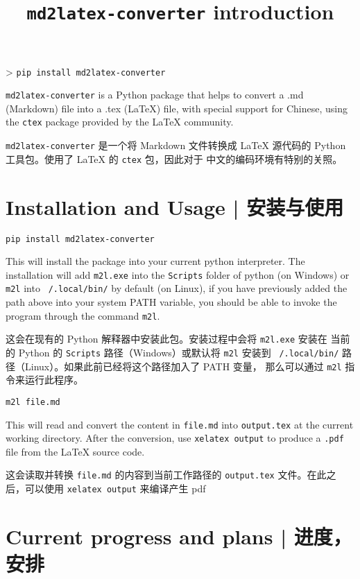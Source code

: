 \documentclass{ctexart}
\title{\texttt{md2latex-converter} introduction }
\begin{document}
	\maketitle

	> \texttt{pip install md2latex-converter}

	\texttt{md2latex-converter} is a Python package that helps to convert a .md (Markdown) file into a .tex (LaTeX) file, with special support for Chinese, using the \texttt{ctex} package provided by the LaTeX community.

	\texttt{md2latex-converter} 是一个将 Markdown 文件转换成 LaTeX 源代码的 Python 工具包。使用了 LaTeX 的 \texttt{ctex} 包，因此对于 中文的编码环境有特别的关照。

	\section{Installation and Usage | 安装与使用}

	\texttt{pip install md2latex-converter}

	This will install the package into your current python interpreter. The installation will add \texttt{m2l.exe} into the \texttt{Scripts} folder of python (on Windows) or \texttt{m2l} into \texttt{~/.local/bin/} by default (on Linux), if you have previously added the path above into your system PATH variable, you should be able to invoke the program through the command \texttt{m2l}.

	这会在现有的 Python 解释器中安装此包。安装过程中会将 \texttt{m2l.exe} 安装在 当前的 Python 的 \texttt{Scripts} 路径（Windows）或默认将 \texttt{m2l} 安装到 \texttt{~/.local/bin/} 路径（Linux）。如果此前已经将这个路径加入了 PATH 变量， 那么可以通过 \texttt{m2l} 指令来运行此程序。

	\texttt{m2l file.md}

	This will read and convert the content in \texttt{file.md} into \texttt{output.tex} at the current working directory. After the conversion, use \texttt{xelatex output} to produce a \texttt{.pdf} file from the LaTeX source code.

	这会读取并转换 \texttt{file.md} 的内容到当前工作路径的 \texttt{output.tex} 文件。在此之后，可以使用 \texttt{xelatex output} 来编译产生 pdf

	\section{Current progress and plans | 进度，安排}
\end{document}
